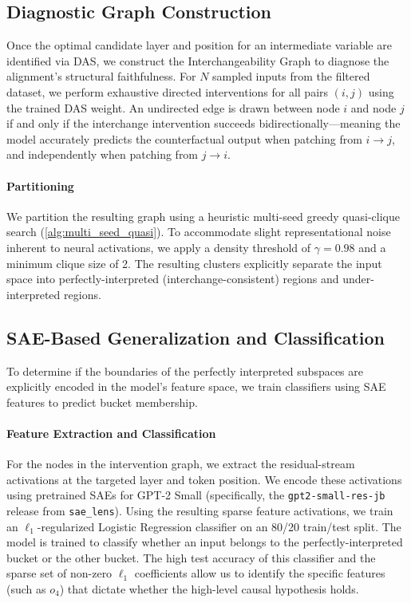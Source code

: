 \subsection{Diagnostic Graph Construction}
Once the optimal candidate layer and position for an intermediate variable are identified via DAS, we construct the Interchangeability Graph to diagnose the alignment's structural faithfulness. For $N$ sampled inputs from the filtered dataset, we perform exhaustive directed interventions for all pairs $(i, j)$ using the trained DAS weight. An undirected edge is drawn between node $i$ and node $j$ if and only if the interchange intervention succeeds bidirectionally---meaning the model accurately predicts the counterfactual output when patching from $i \rightarrow j$, and independently when patching from $j \rightarrow i$. 

\paragraph{Partitioning}
We partition the resulting graph using a heuristic multi-seed greedy quasi-clique search (\cref{alg:multi_seed_quasi}). To accommodate slight representational noise inherent to neural activations, we apply a density threshold of $\gamma = 0.98$ and a minimum clique size of 2. The resulting clusters explicitly separate the input space into perfectly-interpreted (interchange-consistent) regions and under-interpreted regions.

\subsection{SAE-Based Generalization and Classification}
To determine if the boundaries of the perfectly interpreted subspaces are explicitly encoded in the model's feature space, we train classifiers using SAE features to predict bucket membership.

\paragraph{Feature Extraction and Classification}
For the nodes in the intervention graph, we extract the residual-stream activations at the targeted layer and token position. We encode these activations using pretrained SAEs for GPT-2 Small (specifically, the \texttt{gpt2-small-res-jb} release from \texttt{sae\_lens}). Using the resulting sparse feature activations, we train an $\ell_1$-regularized Logistic Regression classifier on an 80/20 train/test split. The model is trained to classify whether an input belongs to the perfectly-interpreted bucket or the other bucket. The high test accuracy of this classifier and the sparse set of non-zero $\ell_1$ coefficients allow us to identify the specific features (such as $o_4$) that dictate whether the high-level causal hypothesis holds.




